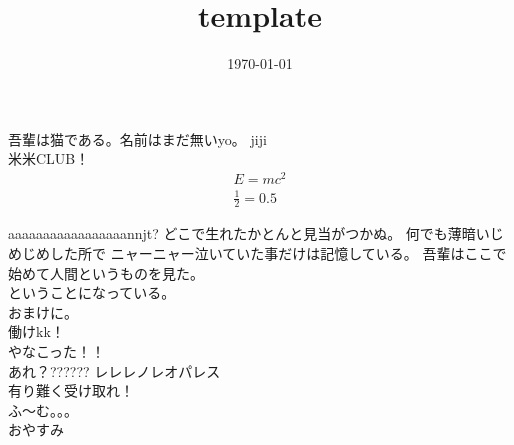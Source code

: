 \documentclass[dvipdfmx,uplatex,titlepage]{jsarticle}
\title{template}
\author{}
\date{\today}
\begin{document}
\maketitle

吾輩は猫である。名前はまだ無いyo。
jiji\\

米米CLUB！\\

\begin{eqnarray}
E=mc^2\\
\frac{1}{2}=0.5
\end{eqnarray}

aaaaaaaaaaaaaaaaannjt?
どこで生れたかとんと見当がつかぬ。
何でも薄暗いじめじめした所で
ニャーニャー泣いていた事だけは記憶している。
吾輩はここで始めて人間というものを見た。\\
ということになっている。\\
おまけに。\\
働けkk！\\
やなこった！！\\
あれ？??????
レレレノレオパレス\\
有り難く受け取れ！\\
ふ〜む。。。\\
おやすみ
\end{document}
